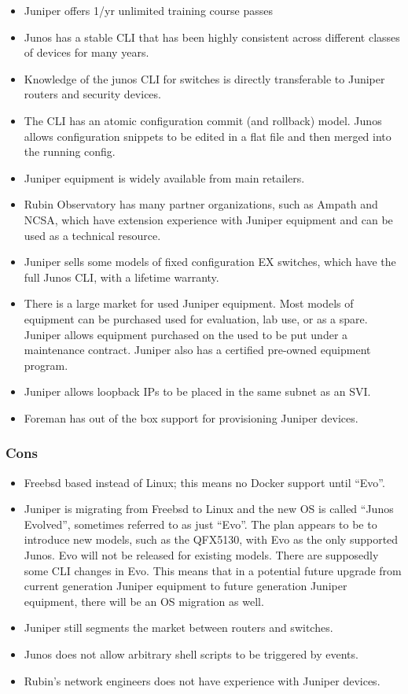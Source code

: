 \begin{itemize}
\item Juniper offers 1/yr unlimited training course passes
\item Junos has a stable CLI that has been highly consistent across different classes of devices for many years.
\item Knowledge of the junos CLI for switches is directly transferable to Juniper routers and security devices.
\item The CLI has an atomic configuration commit (and rollback) model. Junos allows configuration snippets to be edited in a flat file and then merged into the running config.
\item  Juniper equipment is widely available from main retailers.  
\item Rubin Observatory has many partner organizations, such as Ampath and NCSA, which have extension experience with Juniper equipment and can be used as a technical resource.
\item  Juniper sells some models of fixed configuration EX switches, which have the full Junos CLI, with a lifetime warranty.
\item  There is a large market for used Juniper equipment.  Most models of equipment can be purchased used for evaluation, lab use, or as a spare.  Juniper allows equipment purchased on the used to be put under a maintenance contract.  Juniper also has a certified pre-owned equipment program.
\item  Juniper allows loopback IPs to be placed in the same subnet as an SVI.
\item  Foreman has out of the box support for provisioning Juniper devices.
\end{itemize}


\subsubsection{Cons}

\begin{itemize}
\item Freebsd based instead of Linux; this means no Docker support until “Evo”.
\item Juniper is migrating from Freebsd to Linux and the new OS is called “Junos Evolved”, sometimes referred to as just “Evo”.  The plan appears to be to introduce new models, such as the QFX5130, with Evo as the only supported Junos.  Evo will not be released for existing models. There are supposedly some CLI changes in Evo.  This means that in a potential future upgrade from current generation Juniper equipment to future generation Juniper equipment, there will be an OS migration as well.  
\item Juniper still segments the market between routers and switches.
\item Junos does not allow arbitrary shell scripts to be triggered by events.
\item Rubin's network engineers does not have experience with Juniper devices.
\end{itemize}

